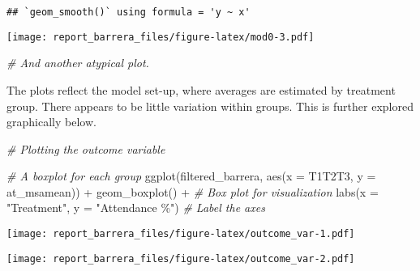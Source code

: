 \documentclass[
]{article}
\newenvironment{Shaded}{\begin{snugshade}}{\end{snugshade}}
\newcommand{\AttributeTok}[1]{\textcolor[rgb]{0.77,0.63,0.00}{#1}}
\newcommand{\CommentTok}[1]{\textcolor[rgb]{0.56,0.35,0.01}{\textit{#1}}}
\newcommand{\FunctionTok}[1]{\textcolor[rgb]{0.00,0.00,0.00}{#1}}
\newcommand{\NormalTok}[1]{#1}
\newcommand{\SpecialCharTok}[1]{\textcolor[rgb]{0.00,0.00,0.00}{#1}}
\newcommand{\StringTok}[1]{\textcolor[rgb]{0.31,0.60,0.02}{#1}}
\begin{document}
\begin{verbatim}
## `geom_smooth()` using formula = 'y ~ x'
\end{verbatim}

\texttt{[image: report\_barrera\_files/figure-latex/mod0-3.pdf]}

\begin{Shaded}
\begin{Highlighting}[]
\CommentTok{\# And another atypical plot.}
\end{Highlighting}
\end{Shaded}

The plots reflect the model set-up, where averages are estimated by
treatment group. There appears to be little variation within groups.
This is further explored graphically below.

\begin{Shaded}
\begin{Highlighting}[]
\CommentTok{\# Plotting the outcome variable}

\CommentTok{\# A boxplot for each group}
\FunctionTok{ggplot}\NormalTok{(filtered\_barrera, }\FunctionTok{aes}\NormalTok{(}\AttributeTok{x =}\NormalTok{ T1T2T3, }\AttributeTok{y =}\NormalTok{ at\_msamean)) }\SpecialCharTok{+}
  \FunctionTok{geom\_boxplot}\NormalTok{() }\SpecialCharTok{+}    \CommentTok{\# Box plot for visualization}
  \FunctionTok{labs}\NormalTok{(}\AttributeTok{x =} \StringTok{"Treatment"}\NormalTok{, }\AttributeTok{y =} \StringTok{"Attendance \%"}\NormalTok{)  }\CommentTok{\# Label the axes}
\end{Highlighting}
\end{Shaded}

\texttt{[image: report\_barrera\_files/figure-latex/outcome\_var-1.pdf]}

\begin{Shaded}
\end{Shaded}

\texttt{[image: report\_barrera\_files/figure-latex/outcome\_var-2.pdf]}
\end{document}
